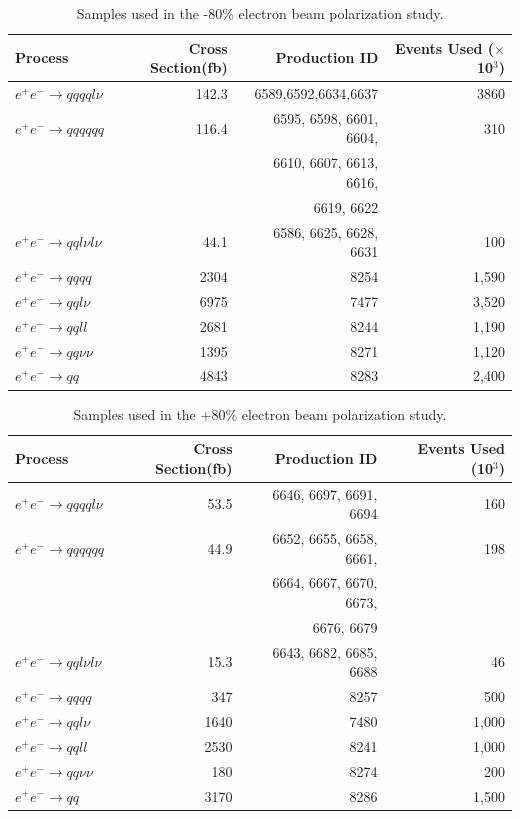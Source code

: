 \begin{table}
  \centering
  \begin{tabular}{l | r | r |r}
    \toprule
    Process     & Cross Section(fb) & Production ID & Events Used ($\times$10$^{3}$) \\
    \midrule
    $e^+e^-\rightarrow qqqql\nu$ & 142.3 & 6589,6592,6634,6637 & 3860 \\
    \midrule
    $e^+e^-\rightarrow qqqqqq$ & 116.4 & 6595, 6598, 6601, 6604,  & 310 \\
     &  & 6610, 6607, 6613, 6616,  &  \\
     &  &  6619, 6622  &  \\
    \midrule
    $e^+e^-\rightarrow qql\nu l\nu$ & 44.1 & 6586, 6625, 6628, 6631 & 100 \\
    \midrule
    $e^+e^-\rightarrow qqqq$ & 2304 & 8254 & 1,590 \\
    \midrule
    $e^+e^-\rightarrow qql\nu$ & 6975 & 7477 & 3,520 \\
    \midrule
    $e^+e^-\rightarrow qqll$ & 2681 & 8244 & 1,190 \\
    \midrule
    $e^+e^-\rightarrow qq\nu\nu$ & 1395 & 8271 & 1,120 \\
    \midrule
    $e^+e^-\rightarrow qq$ & 4843 & 8283 & 2,400 \\
    \bottomrule
  \end{tabular}
  \caption{Samples used in the -80\% electron beam polarization study.}
  \label{table:topsamplesnegpol}
\end{table}

\begin{table}
  \centering
  \begin{tabular}{l | r | r |r}
    \toprule
    Process     & Cross Section(fb) & Production ID & Events Used (10$^{3}$) \\
    \midrule
    $e^+e^-\rightarrow qqqql\nu$ & 53.5 & 6646, 6697, 6691, 6694 & 160 \\
    \midrule
    $e^+e^-\rightarrow qqqqqq$ & 44.9 & 6652, 6655, 6658, 6661, & 198 \\
     &  & 6664, 6667, 6670, 6673, &  \\
     &  & 6676, 6679 &  \\
    \midrule
    $e^+e^-\rightarrow qql\nu l\nu$ & 15.3  & 6643, 6682, 6685, 6688 & 46 \\
    \midrule
    $e^+e^-\rightarrow qqqq$ & 347 & 8257 & 500 \\
    \midrule
    $e^+e^-\rightarrow qql\nu$ & 1640 & 7480 & 1,000 \\
    \midrule
    $e^+e^-\rightarrow qqll$ & 2530 & 8241 & 1,000 \\
    \midrule
    $e^+e^-\rightarrow qq\nu\nu$ & 180 & 8274 & 200 \\
    \midrule
    $e^+e^-\rightarrow qq$ & 3170 & 8286 & 1,500 \\
    \bottomrule
  \end{tabular}
  \caption{Samples used in the +80\% electron beam polarization study.}
  \label{table:topsamplespospol}
\end{table}


